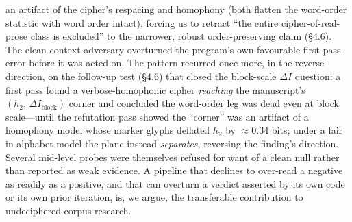 \documentclass[11pt]{article}
\begin{document}
an artifact of the cipher's respacing and homophony (both flatten the word-order statistic
with word order intact), forcing us to retract ``the entire cipher-of-real-prose class is
excluded'' to the narrower, robust order-preserving claim (\S4.6). The clean-context adversary
overturned the program's own favourable first-pass error before it was acted on. The pattern
recurred once more, in the reverse direction, on the follow-up test (\S4.6) that closed the
block-scale $\Delta I$ question: a first pass found a verbose-homophonic cipher \emph{reaching}
the manuscript's $(h_2,\,\Delta I_{\text{block}})$ corner and concluded the word-order leg was
dead even at block scale---until the refutation pass showed the ``corner'' was an artifact of a
homophony model whose marker glyphs deflated $h_2$ by $\approx\!0.34$ bits; under a fair
in-alphabet model the plane instead \emph{separates}, reversing the finding's direction. Several
mid-level
probes were themselves refused for want of a clean null rather than reported as weak
evidence. A pipeline that declines to over-read a negative as readily as a positive, and
that can overturn a
verdict asserted by its own code or its own prior iteration, is, we argue, the
transferable contribution to undeciphered-corpus research.
\end{document}
